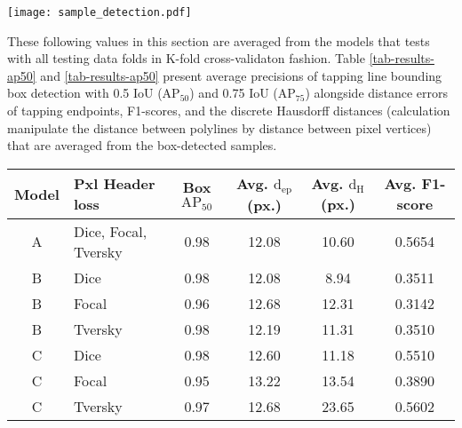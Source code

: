 \documentclass[default,pdflatex,iicol]{sn-jnl}%
\begin{document}
\begin{figure*}[h]%
\centering
\texttt{[image: sample\_detection.pdf]}
\caption{Some detection samples from various models. A pair of two images presents the tapping panel image with original size to scale beside its magnified view. Detected or the predicted boxes with polyline insides are displayed in yellow. The dashed box with a polyline in red is the groundtruth}\label{fig-sampledetection}
\end{figure*}

These following values in this section are averaged from the models that tests with all testing data folds in K-fold cross-validaton fashion. Table \ref{tab-results-ap50} and \ref{tab-results-ap50} present average precisions of tapping line bounding box detection with 0.5 IoU ($\mathrm{AP}_{50}$) and 0.75 IoU ($\mathrm{AP}_{75}$) alongside distance errors of tapping endpoints, F1-scores, and the discrete Hausdorff distances (calculation manipulate the distance between polylines by distance between pixel vertices) that are averaged from the box-detected samples.

\begin{table*}[]
\centering
\caption{Detection results on the proposed model and baseline models at various settings. All metrics are averaged on the box-detected samples at 0.5 IoU}
\label{tab-results-ap50}
\begin{minipage}{\linewidth}
\begin{center}
\begin{tabular}{clcccc}
Model & Pxl Header loss & Box $\mathrm{AP_{50}}$ & Avg. $\mathrm{d_{ep}}$(px.)	& Avg. $\mathrm{d_{H}}$(px.)	& Avg. F1-score	\\ \midrule
A 	& Dice, Focal, Tversky 	& 0.98	&	12.08		& 	10.60	&	 0.5654 \\ \midrule
B	& Dice		& 0.98	&	12.08	&	8.94	& 0.3511	\\
B	& Focal		& 0.96	&	12.68	&	12.31	&	0.3142	\\ 
B	& Tversky	& 0.98 	&	12.19	&  11.31	&	0.3510   \\ \midrule
C 	& Dice		& 0.98	&	12.60	&	11.18	&	0.5510	\\
C 	& Focal		& 0.95	&	13.22	&	13.54	&	0.3890	\\
C 	& Tversky	& 0.97	&	12.68	&	23.65	&	0.5602	\\ 
\bottomrule
\end{tabular}%
\end{center}
\end{minipage}
\end{table*}
\end{document}
